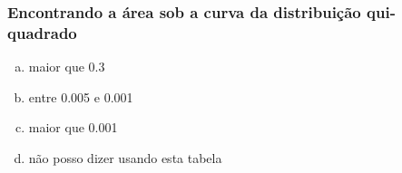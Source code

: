 \begin{frame}
\frametitle{Encontrando a área sob a curva da distribuição qui-quadrado}
\justifying
{}

{
{\small
\begin{enumerate}[(a)]
\setlength{\itemsep}{0in}
\item maior que 0.3
\item entre 0.005 e 0.001
\item maior que 0.001
\item não posso dizer usando esta tabela
\end{enumerate}
}
}
\end{frame}


